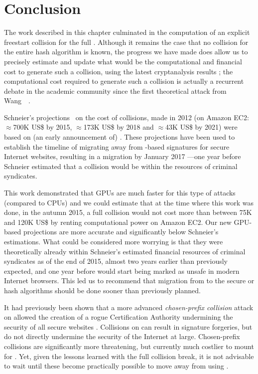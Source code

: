 \section{Conclusion}
\label{sec:conclusion}

The work described in this chapter culminated in the computation of an explicit freestart collision for the full \shaone. Although it remains the case that no collision for the entire hash algorithm is known,
the progress we have made does allow us to precisely estimate and update what would be the computational and financial cost to generate such a collision, using the latest cryptanalysis results \cite{DBLP:conf/eurocrypt/Stevens13};
the computational cost required to generate such a collision is actually a recurrent debate in the academic community since the first theoretical attack from Wang~\etal~\cite{DBLP:conf/crypto/WangYY05a}.

Schneier's projections~\cite{schneierSHA1} on the cost of \shaone collisions, made in 2012 (on Amazon EC2: $\approx$700K US\$ by 2015, $\approx$173K US\$ by 2018 and $\approx$43K US\$ by 2021) were based on
(an early announcement of) \cite{DBLP:conf/eurocrypt/Stevens13}. These projections have been used to establish the timeline of migrating away from \shaone-based signatures for secure Internet websites,
resulting in a migration by January 2017 ---one year before Schneier estimated that a \shaone collision would be within the resources of criminal syndicates. 

This work demonstrated that GPUs are much faster for this type of attacks (compared to CPUs)
and we could estimate that at the time where this work was done, in the autumn 2015, a full \shaone collision would not cost more than between 75K and 120K US\$ by renting computational power on Amazon EC2.
Our new GPU-based projections are more accurate and significantly below Schneier's estimations. What could be considered more worrying
is that they were theoretically already within Schneier's estimated financial resources of criminal syndicates as of the end of 2015,
almost two years earlier than previously expected, and one year before \shaone would start being marked as unsafe in modern Internet browsers.
This led us to recommend that migration from \shaone to the secure \shatwo or \shathree hash algorithms should be done sooner than previously planned.

It had previously been shown that a more advanced \emph{chosen-prefix collision} attack on \mdfive allowed the creation of a rogue Certification Authority undermining the security of all secure websites \cite{DBLP:conf/crypto/StevensSALMOW09}. 
Collisions on \shaone can result in \eg{} signature forgeries, but do not directly undermine the security of the Internet at large. Chosen-prefix collisions
are significantly more threatening, but currently much costlier to mount for \shaone. Yet, given the lessons learned with the \mdfive full collision break, it is not advisable to wait until these become practically possible
to move away from using \shaone.

